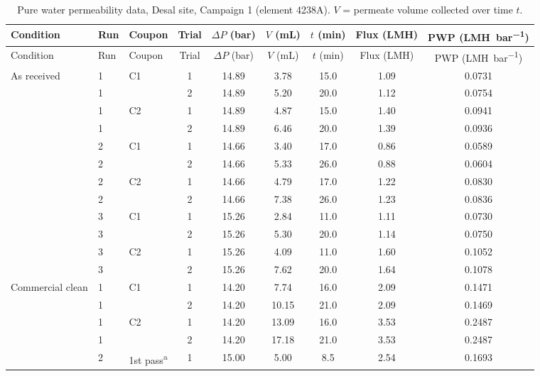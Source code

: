 {\footnotesize\setlength{\tabcolsep}{4pt}
\begin{longtable}{>{\raggedright\arraybackslash}p{2.2cm}llcccccc}
  \caption{Pure water permeability data, Desal site, Campaign 1 (element 4238A). $V$ = permeate volume collected over time $t$.}
  \label{tab:app-c1-4238A-pwp}\\
  \toprule
  Condition & Run & Coupon & Trial & $\Delta P$ (\unit{bar}) & $V$ (\unit{mL}) & $t$ (\unit{min}) & Flux (\unit{LMH}) & PWP (\unit{LMH.bar^{-1}}) \\
  \midrule
  \endfirsthead
  \toprule
  Condition & Run & Coupon & Trial & $\Delta P$ (\unit{bar}) & $V$ (\unit{mL}) & $t$ (\unit{min}) & Flux (\unit{LMH}) & PWP (\unit{LMH.bar^{-1}}) \\
  \midrule
  \endhead
    As received & 1 & C1 & 1 & 14.89 & 3.78 & 15.0 & 1.09 & 0.0731 \\
     & 1 &  & 2 & 14.89 & 5.20 & 20.0 & 1.12 & 0.0754 \\
    \addlinespace[2pt]
     & 1 & C2 & 1 & 14.89 & 4.87 & 15.0 & 1.40 & 0.0941 \\
     & 1 &  & 2 & 14.89 & 6.46 & 20.0 & 1.39 & 0.0936 \\
    \addlinespace[2pt]
     & 2 & C1 & 1 & 14.66 & 3.40 & 17.0 & 0.86 & 0.0589 \\
     & 2 &  & 2 & 14.66 & 5.33 & 26.0 & 0.88 & 0.0604 \\
    \addlinespace[2pt]
     & 2 & C2 & 1 & 14.66 & 4.79 & 17.0 & 1.22 & 0.0830 \\
     & 2 &  & 2 & 14.66 & 7.38 & 26.0 & 1.23 & 0.0836 \\
    \addlinespace[2pt]
     & 3 & C1 & 1 & 15.26 & 2.84 & 11.0 & 1.11 & 0.0730 \\
     & 3 &  & 2 & 15.26 & 5.30 & 20.0 & 1.14 & 0.0750 \\
    \addlinespace[2pt]
     & 3 & C2 & 1 & 15.26 & 4.09 & 11.0 & 1.60 & 0.1052 \\
     & 3 &  & 2 & 15.26 & 7.62 & 20.0 & 1.64 & 0.1078 \\
    \midrule
    Commercial clean & 1 & C1 & 1 & 14.20 & 7.74 & 16.0 & 2.09 & 0.1471 \\
     & 1 &  & 2 & 14.20 & 10.15 & 21.0 & 2.09 & 0.1469 \\
    \addlinespace[2pt]
     & 1 & C2 & 1 & 14.20 & 13.09 & 16.0 & 3.53 & 0.2487 \\
     & 1 &  & 2 & 14.20 & 17.18 & 21.0 & 3.53 & 0.2487 \\
    \addlinespace[2pt]
     & 2 & 1st pass\textsuperscript{a} & 1 & 15.00 & 5.00 & 8.5 & 2.54 & 0.1693 \\

\end{longtable}}
